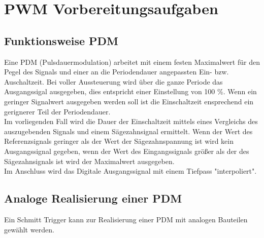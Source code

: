 \documentclass[a4paper,11pt,DIV=11,parskip=half]{scrartcl}
\begin{document}
\section{PWM Vorbereitungsaufgaben}
\subsection{Funktionsweise PDM}
Eine PDM (Pulsdauermodulation) arbeitet mit einem festen Maximalwert für den Pegel des Signals und einer an die Periodendauer angepassten Ein- bzw. Auschaltzeit. Bei voller Aussteuerung wird über die ganze Periode das Ausgangssigal ausgegeben, dies entspricht einer Einstellung von 100 \%. 
Wenn ein geringer Signalwert ausgegeben werden soll ist die Einschaltzeit ensprechend ein gerignerer Teil der Periodendauer. \\
Im vorliegenden Fall wird die Dauer der Einschaltzeit mittels eines Vergleichs des auszugebenden Signals und einem Sägezahnsignal ermittelt. Wenn der Wert des Referenzsignals geringer als der Wert der Sägezahnspannung ist wird kein Ausgangssignal gegeben, wenn der Wert des Eingangssignals größer als der des Sägezahnsignals ist wird der Maximalwert ausgegeben. \\
Im Anschluss wird das Digitale Ausgangssignal mit einem Tiefpass "interpoliert".
\subsection{Analoge Realisierung einer PDM}
Ein Schmitt Trigger kann zur Realisierung einer PDM mit analogen Bauteilen gewählt werden.
\end{document}
